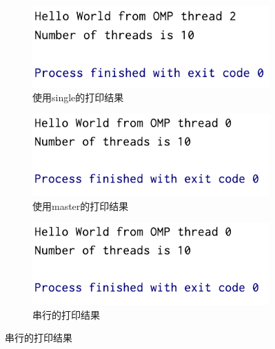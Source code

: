 \documentclass{article}
\begin{document}
\begin{figure}[H]
    \centering
    \begin{subfigure}[b]{0.3\textwidth}
        \centering
        \includegraphics[width=\textwidth]{single.png}
        \caption{使用single的打印结果}
        \label{fig:1}
    \end{subfigure}
    \hfill
    \begin{subfigure}[b]{0.3\textwidth}
        \centering
        \includegraphics[width=\textwidth]{master.png}
        \caption{使用master的打印结果}
        \label{fig:2}
    \end{subfigure}
    \hfill
    \begin{subfigure}[b]{0.3\textwidth}
        \centering
        \includegraphics[width=\textwidth]{master.png}
        \caption{串行的打印结果}
        \label{fig:3}
    \end{subfigure}


\end{figure}
\end{document}
